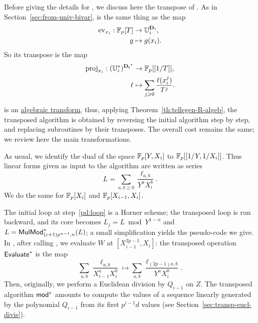 Before giving the details for , we discuss here the
transpose of .  As in
Section~\ref{sec:from-univ-bivar},  is the same thing
as the map
\begin{equation}
  \label{eq:81}
  \begin{aligned}
    \operatorname{ev}_{x_i}:\mathbb{F}_p[T] &\rightarrow \mathbb{U}_i^{\mathbf{D}_i}\text{,}\\ 
    g&\mapsto g(x_i)\text{.}
  \end{aligned}
\end{equation}
So its transpose is the map
\begin{equation}
  \label{eq:82}
  \begin{aligned}
    \operatorname{proj}_{x_i}:(\mathbb{U}_i^\ast)^{\mathbf{D_i}^\ast}&\rightarrow\mathbb{F}_p[[1/T]]\text{,}\\
    \ell&\mapsto\sum_{j\geqslant0}\frac{\ell(x_i^j)}{T^j}\text{.}
  \end{aligned}
\end{equation}

 is an \hyperref[sec:r-algebraic-transforms]{algebraic
  transform}, thus, applying Theorem~\ref{th:tellegen-R-algeb}, the
transposed algorithm is obtained by reversing the initial algorithm
step by step, and replacing subroutines by their transposes. The
overall cost remains the same; we review here the main
transformations.

As usual, we identify the dual of the space $\mathbb{F}_p[Y,X_i]$ to
$\mathbb{F}_p[[1/Y,1/X_i]]$. Thus linear forms given as input to the algorithm
are written as series
\begin{equation}
  \label{eq:84}
  L=\sum_{a,b\ge0}\frac{\ell_{a,b}}{Y^aX_i^b}
  \text{.}
\end{equation}
We do the same for $\mathbb{F}_p[X_i]$ and $\mathbb{F}_p[X_{i-1},X_i]$.

The initial loop at step~\ref{pd:loop} is a Horner scheme; the
transposed loop is run backward, and its core becomes $L_j=L\bmod
Y^{1-n}$ and $L={\sf MulMod}_{(c+1)p^{n-1},n}^\ast(L)$; a small
simplification yields the pseudo-code we give.  In ,
after calling , we evaluate $W$ at
$[X_{i-1}^{2p-1},X_i]$: the transposed operation ${\sf
    Evaluate}^\ast$ is the map
\begin{equation}
  \label{eq:83}
  \sum_{a,b} \frac{\ell_{a,b}}{X_{i-1}^a X_i^b} \mapsto
  \sum_{a,b} \frac{\ell_{(2p-1)a,b}}{Y^a X_i^b}
  \text{.} 
\end{equation}
Then, originally, we perform a Euclidean division by $Q_{i-1}$ on
$Z$. The transposed algorithm
$\sf mod^\ast$ amounts to compute the values of a sequence linearly
generated by the polynomial $Q_{i-1}$ from its first $p^{i-1}d$ values
(see Section~\ref{sec:transp-eucl-divis}).

